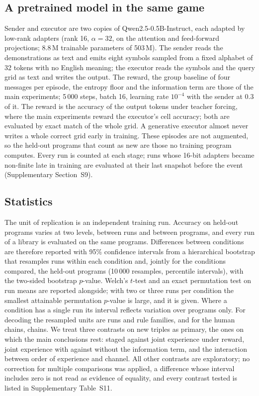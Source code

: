 \documentclass{nature}
\begin{document}
\begin{methods}
\subsection{A pretrained model in the same game}
Sender and executor are two copies of Qwen2.5-0.5B-Instruct, each adapted by low-rank adapters (rank 16,
$\alpha=32$, on the attention and feed-forward projections; 8.8\,M trainable parameters of 503\,M). The sender
reads the demonstrations as text and emits eight symbols sampled from a fixed alphabet of 32 tokens with no English
meaning; the executor reads the symbols and the query grid as text and writes the output. The reward, the group
baseline of four messages per episode, the entropy floor and the information term are those of the main
experiments; 5\,000 steps, batch 16, learning rate $10^{-4}$ with the sender at 0.3 of it. The reward is the
accuracy of the output tokens under teacher forcing, where the main experiments reward the executor's cell accuracy;
both are evaluated by exact match of the whole grid. A generative executor almost never writes a whole correct grid
early in training. These episodes are not augmented, so the
held-out programs that count as new are those no training program computes. Every run is counted at each stage; runs whose
16-bit adapters became non-finite late in training are evaluated at their last snapshot before the event
(Supplementary Section~S9).

\subsection{Statistics}
The unit of replication is an independent training run. Accuracy on held-out programs varies at two levels,
between runs and between programs, and every run of a library is evaluated on the same programs. Differences
between conditions are therefore reported with 95\% confidence intervals from a hierarchical bootstrap
\cite{saravanan2020} that resamples runs within each condition and, jointly for the conditions compared, the
held-out programs (10\,000 resamples, percentile intervals), with the two-sided bootstrap $p$-value. Welch's
$t$-test and an exact permutation test on run means are reported alongside; with two or three runs per condition
the smallest attainable permutation $p$-value is large, and it is given. Where a condition has a single run its
interval reflects variation over programs only. For decoding the resampled units are runs and rule families,
and for the human chains, chains. We treat three contrasts on new triples as primary, the ones on which the
main conclusions rest: staged against joint experience under reward, joint experience with against without the
information term, and the interaction between order of experience and channel. All other contrasts are
exploratory; no correction for multiple comparisons was applied, a difference whose interval includes zero is
not read as evidence of equality, and every contrast tested is listed in Supplementary Table~S11.


\end{methods}
\end{document}
